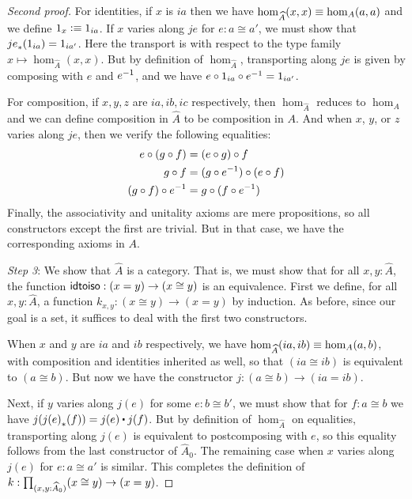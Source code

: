\begin{proof}[Second proof]
  For identities, if $x$ is $ia$ then we have $\hom_{\widehat A}(x,x) \equiv \hom_A(a,a)$ and we define $1_x \vcentcolon\equiv 1_{ia}$.
  If $x$ varies along $je$ for $e:a\cong a'$, we must show that ${je}_{*}\mathopen{}\left({1_{ia}}\right)\mathclose{} = 1_{ia'}$.
  Here the transport is with respect to the type family $x\mapsto \hom_{\widehat A}(x,x)$.
  But by definition of $\hom_{\widehat A}$, transporting along $je$ is given by composing with $e$ and ${e}^{-1}$, and we have $e\circ 1_{ia} \circ {e}^{-1} = 1_{ia'}$.

  For composition, if $x,y,z$ are $ia,ib,ic$ respectively, then $\hom_{\widehat A}$ reduces to $\hom_A$ and we can define composition in $\widehat A$ to be composition in $A$.
  And when $x$, $y$, or $z$ varies along $je$, then we verify the following equalities:
  \begin{align*}
    e \circ (g\circ f) &= (e\circ g) \circ f\\
    g\circ f &= (g\circ {e}^{-1}) \circ (e\circ f)\\
    (g\circ f) \circ {e}^{-1} &= g \circ (f\circ {e}^{-1})
  \end{align*}
  Finally, the associativity and unitality axioms are mere propositions, so all constructors except the first are trivial.
  But in that case, we have the corresponding axioms in $A$.

  \mentalpause

  \emph{Step 3}: We show that $\widehat A$ is a category.
  That is, we must show that for all $x,y:\widehat A$, the function $\mathsf{idtoiso}:(x=y) \to (x\cong y)$ is an equivalence.
  First we define, for all $x,y:\widehat A$, a function $k_{x,y}:(x\cong y) \to (x=y)$ by induction.
  As before, since our goal is a set, it suffices to deal with the first two constructors.

  When $x$ and $y$ are $ia$ and $ib$ respectively, we have $\hom_{\widehat A}(ia,ib)\equiv \hom_A(a,b)$, with composition and identities inherited as well, so that $(ia\cong ib)$ is equivalent to $(a\cong b)$.
  But now we have the constructor $j:(a\cong b) \to (ia=ib)$.

  Next, if $y$ varies along $j(e)$ for some $e:b\cong b'$, we must show that for $f:a\cong b$ we have $j(\trans{j(e)}{f}) = j(e) \ct j(f)$.
  But by definition of $\hom_{\widehat A}$ on equalities, transporting along $j(e)$ is equivalent to postcomposing with $e$, so this equality follows from the last constructor of $\widehat A_0$.
  The remaining case when $x$ varies along $j(e)$ for $e:a\cong a'$ is similar.
  This completes the definition of $k:\prd{x,y:\widehat A_0} (x\cong y) \to (x=y)$.


\end{proof}
